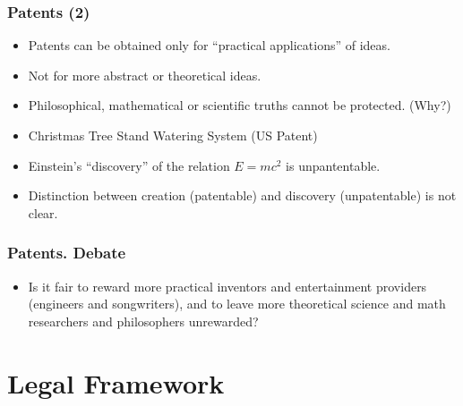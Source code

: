 \documentclass{beamer}
\begin{document}
\begin{frame}
\frametitle{Patents (2)}

\begin{itemize}

\item Patents can be obtained only for ``practical applications'' of ideas.
\item Not for more abstract or theoretical ideas.
\item Philosophical, mathematical or scientific truths cannot be protected. (Why?)
\item Christmas Tree Stand Watering System (US Patent)
\item Einstein's ``discovery'' of the relation $E=mc^2$ is unpantentable.
\item Distinction between \alert{creation} (patentable) and \alert{discovery} (unpatentable) is not clear.
\end{itemize}

\end{frame}


\begin{frame}
\frametitle{Patents. Debate}

\begin{itemize}
\item Is it fair to reward more \alert{practical inventors} and entertainment providers (engineers and songwriters), and to leave 
  more \alert{theoretical science} and \alert{math researchers} and \alert{philosophers} unrewarded?
\end{itemize}

\end{frame}


\section{Legal Framework}
\end{document}
